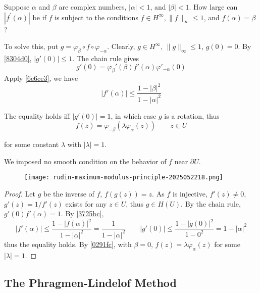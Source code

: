 Suppose $\alpha$ and $\beta$ are complex numbers, $|\alpha|<1$, and $|\beta|<1$. How large can $\left|f^{\prime}(\alpha)\right|$ be if $f$ is subject to the conditions $f \in H^{\infty},\|f\|_{\infty} \leq 1$, and $f(\alpha)=\beta$?

To solve this, put $g=\varphi_{\beta}\circ f\circ\varphi_{-\alpha}$. Clearly, $g\in H^{\infty}$, $\lVert g \rVert_{\infty}\leq1$, $g(0)=0$. By \cref{8304d0}, $\lvert g'(0) \rvert\leq1$. The chain rule gives
\[
g'(0)=\varphi_{\beta}'(\beta)f'(\alpha)\varphi'_{-\alpha}(0)
\]
Apply \cref{6e6ce3}, we have
\begin{equation}
\lvert f'(\alpha) \rvert \leq \frac{1-\lvert \beta \rvert ^2}{1-\lvert \alpha \rvert ^2}
\label{3725bc}
\end{equation}

The equality holds iff $\lvert g'(0) \rvert=1$, in which case $g$ is a rotation, thus
\begin{equation}
f(z)=\varphi_{-\beta}(\lambda\varphi_{\alpha}(z))\qquad z\in U
\label{0291fc}
\end{equation}

for some constant $\lambda$ with $\lvert \lambda \rvert=1$.

\begin{note}
We imposed no smooth condition on the behavior of $f$ near $\partial U$.
\end{note}
\begin{figure}[H]
\centering
\texttt{[image: rudin-maximum-modulus-principle-2025052218.png]}
\label{}
\end{figure}

\begin{proof}
Let $g$ be the inverse of $f$, $f(g(z))=z$. As $f$ is injective, $f'(z)\neq0$,  $g'(z)=1/f'(z)$ exists for any $z\in U$, thus $g\in H(U)$. By the chain rule, $g'(0)f'(\alpha)=1$. By \cref{3725bc},
\[
\lvert f'(\alpha) \rvert \leq\frac{1-\lvert f(\alpha) \rvert ^2}{1-\lvert \alpha \rvert ^2} =\frac{1}{1-\lvert \alpha \rvert ^2}\qquad \lvert g'(0) \rvert \leq\frac{1-\lvert g(0) \rvert ^2}{1-0^2}=  1-\lvert \alpha \rvert ^2
\]
thus the equality holds. By \cref{0291fc}, with $\beta=0$, $f(z)=\lambda\varphi_{\alpha}(z)$ for some $\lvert \lambda \rvert=1$.
\end{proof}

\subsection{The Phragmen-Lindelof Method}

